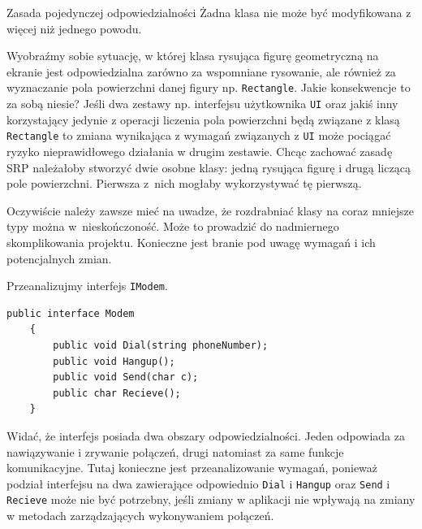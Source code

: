 \begin{myboxWithTitle}{Zasada pojedynczej odpowiedzialności}
	Żadna klasa nie może być modyfikowana z więcej niż jednego powodu.
\end{myboxWithTitle}

Wyobraźmy sobie sytuację, w której klasa rysująca figurę geometryczną na ekranie jest odpowiedzialna zarówno za wspomniane rysowanie, ale również za wyznaczanie pola powierzchni danej figury np. \texttt{Rectangle}. Jakie konsekwencje to za sobą niesie? Jeśli dwa zestawy np. interfejsu użytkownika \texttt{UI} oraz jakiś inny korzystający jedynie z operacji liczenia pola powierzchni będą związane z klasą \texttt{Rectangle} to zmiana wynikająca z wymagań związanych z \texttt{UI} może pociągać ryzyko nieprawidłowego działania w drugim zestawie. Chcąc zachować zasadę SRP należałoby stworzyć dwie osobne klasy: jedną rysująca figurę i drugą liczącą pole powierzchni. Pierwsza z~nich mogłaby wykorzystywać tę pierwszą. 

Oczywiście należy zawsze mieć na uwadze, że rozdrabniać klasy na coraz mniejsze typy można w~nieskończoność. Może to prowadzić do nadmiernego skomplikowania projektu. Konieczne jest branie pod uwagę wymagań i ich potencjalnych zmian.

Przeanalizujmy interfejs \texttt{IModem}.
\begin{lstlisting}[caption={Naruszenie zasady SRP}, label={lab1/lst/srpViolationModem}]
	public interface Modem
	{
		public void Dial(string phoneNumber);
		public void Hangup();
		public void Send(char c);
		public char Recieve();
	}
\end{lstlisting}
Widać, że interfejs posiada dwa obszary odpowiedzialności. Jeden odpowiada za nawiązywanie i zrywanie połączeń, drugi natomiast za same funkcje komunikacyjne. Tutaj konieczne jest przeanalizowanie wymagań, ponieważ podział interfejsu na dwa zawierające odpowiednio \texttt{Dial} i \texttt{Hangup} oraz \texttt{Send} i \texttt{Recieve} może nie być potrzebny, jeśli zmiany w aplikacji nie wpływają na zmiany w metodach zarządzających wykonywaniem połączeń.

